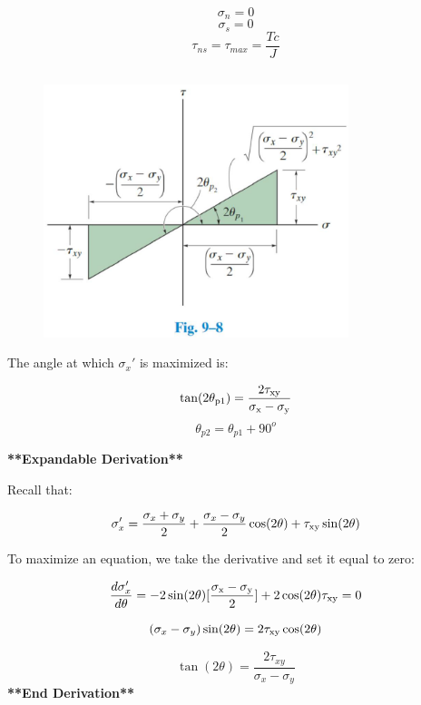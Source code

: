 \[\sigma_n = 0\] 
\[\sigma_s = 0\] 
\[\tau_{ns} = \tau_{max} = \frac{Tc}{J}\]


\subsection{}

\begin{figure}[!h]
\centering
\includegraphics[angle=0, width=3.5in]{Stress Transformation-Figures/Principle Stresses.png}
\vspace{-2mm}
\caption{\small {}}
\vspace{-3mm}
\label{Fig:PrinStress}
\end{figure}

\noindent The angle at which $\sigma_{x}'$ is maximized is:

\[\rm\tan(2\theta_{p1}) = \frac{2\tau_{xy}}{\sigma_x - \sigma_y}\]
\[\theta_{p2} = \theta_{p1} + 90^o\]

\noindent \textbf{**Expandable Derivation**}

\noindent Recall that: 

\[\sigma_x' = \frac{\sigma_x + \sigma_y}{2} + \frac{\sigma_x - \sigma_y}{2}\rm\cos(2\theta) + \tau_{xy}\sin(2\theta)\]

\noindent To maximize an equation, we take the derivative and set it equal to zero:

\[\frac{d\sigma_{x}'}{d\theta} = -2\rm\sin(2\theta)[\frac{\sigma_x-\sigma_y}{2}] + 2\rm\cos(2\theta)\tau_{xy} = 0 \]

\[(\sigma_x - \sigma_y)\rm\sin(2\theta) = 2\tau_{xy}\rm\cos(2\theta)\]

\[\tan(2\theta) = \frac{2\tau_{xy}}{\sigma_x - \sigma_y}\]
 \noindent \textbf{**End Derivation**}
 
